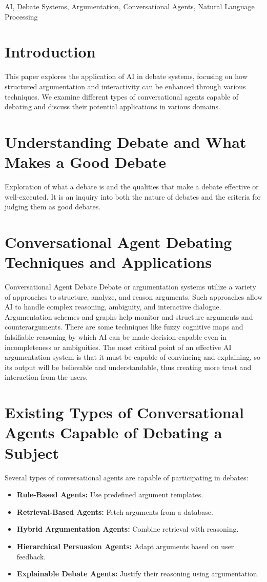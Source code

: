 \documentclass[conference]{IEEEtran}
\begin{document}
\begin{IEEEkeywords}
AI, Debate Systems, Argumentation, Conversational Agents, Natural Language Processing
\end{IEEEkeywords}

\section{Introduction}
This paper explores the application of AI in debate systems, focusing on how structured argumentation and interactivity can be enhanced through various techniques. We examine different types of conversational agents capable of debating and discuss their potential applications in various domains.

\section{Understanding Debate and What Makes a Good Debate}
Exploration of what a debate is and the qualities that make a debate effective or well-executed. It is an inquiry into both the nature of debates and the criteria for judging them as good debates.

\section{Conversational Agent Debating Techniques and Applications}
Conversational Agent Debate Debate or argumentation systems utilize a variety of approaches to structure, analyze, and reason arguments. Such approaches allow AI to handle complex reasoning, ambiguity, and interactive dialogue. Argumentation schemes and graphs help monitor and structure arguments and counterarguments. There are some techniques like fuzzy cognitive maps and falsifiable reasoning by which AI can be made decision-capable even in incompleteness or ambiguities. The most critical point of an effective AI argumentation system is that it must be capable of convincing and explaining, so its output will be believable and understandable, thus creating more trust and interaction from the users.

\section{Existing Types of Conversational Agents Capable of Debating a Subject}
Several types of conversational agents are capable of participating in debates:

\begin{itemize}
    \item \textbf{Rule-Based Agents:} Use predefined argument templates.
    \item \textbf{Retrieval-Based Agents:} Fetch arguments from a database.
    \item \textbf{Hybrid Argumentation Agents:} Combine retrieval with reasoning.
    \item \textbf{Hierarchical Persuasion Agents:} Adapt arguments based on user feedback.
    \item \textbf{Explainable Debate Agents:} Justify their reasoning using argumentation.
\end{itemize}
\end{document}
